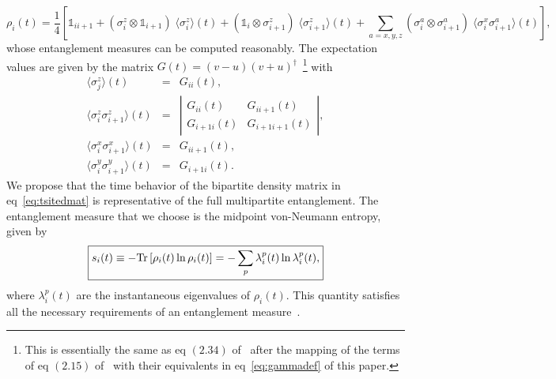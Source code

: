 \documentclass[a4paper,10pt]{article}
\begin{document}
\begin{equation}
 \rho_i(t) = \frac{1}{4} \left[ \mathds{1}_{ii+1} +  \left(\sigma^z_i\otimes \mathds{1}_{i+1}\right)\;\langle\sigma^z_i\rangle(t) +  \left(\mathds{1}_{i}\otimes\sigma^z_{i+1}\right)\;\langle\sigma^z_{i+1}\rangle(t) + \sum_{a=x,y,z}\left(\sigma^a_i\otimes\sigma^a_{i+1}\right)\;\langle \sigma^x_i\sigma^a_{i+1}\rangle(t)\right],
\end{equation}
whose entanglement measures can be computed reasonably. The expectation values are given by the matrix
$G(t) = \left(v-u\right)\left(v+u\right)^\dagger$~\footnote{ This is essentially the same as eq $(2.34)$ of~\cite{lieb} after the mapping of the terms of eq $(2.15)$ of~\cite{lieb} with their equivalents in eq~\ref{eq:gammadef} of this paper.}
with~\cite{hatano}
\begin{eqnarray}
 \langle \sigma^z_j\rangle(t) &=& G_{ii}(t),\nonumber \\
 \langle \sigma^z_i\sigma^z_{i+1}\rangle(t) &=& \left|\begin{matrix}
       G_{ii}(t) & G_{ii+1}(t)\\
       G_{i+1i}(t) & G_{i+1i+1}(t)
      \end{matrix}\right|, \nonumber \\
 \langle \sigma^x_i\sigma^x_{i+1}\rangle(t) &=& G_{ii+1}(t),\nonumber \\
 \langle \sigma^y_i\sigma^y_{i+1}\rangle(t) &=& G_{i+1i}(t).
\end{eqnarray}
We propose that the time behavior of the bipartite density matrix in eq~\ref{eq:tsitedmat} is representative of the full multipartite entanglement. The entanglement measure that we choose is the midpoint von-Neumann entropy, given by
\begin{equation}
\label{eq:vonneumann}
\boxed{s_i(t) \equiv -{\rm Tr}\left[\rho_i(t) \ln{\rho_i(t)}\right] = -\sum_p \lambda^p_i(t)\ln{\lambda^p_i(t)},} 
\end{equation}
where $\lambda^p_i(t)$ are the instantaneous eigenvalues of $\rho_i(t)$. This quantity satisfies all the necessary requirements of an entanglement measure~\cite{vidal,plenio}.
\end{document}
